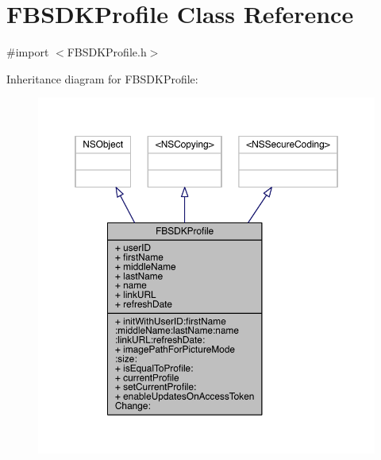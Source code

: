 \hypertarget{interface_f_b_s_d_k_profile}{\section{F\-B\-S\-D\-K\-Profile Class Reference}
\label{interface_f_b_s_d_k_profile}
}


{\ttfamily \#import $<$F\-B\-S\-D\-K\-Profile.\-h$>$}



Inheritance diagram for F\-B\-S\-D\-K\-Profile\-:
\nopagebreak
\begin{figure}[H]
\begin{center}
\leavevmode
\includegraphics[width=350pt]{interface_f_b_s_d_k_profile__inherit__graph}
\end{center}
\end{figure}


